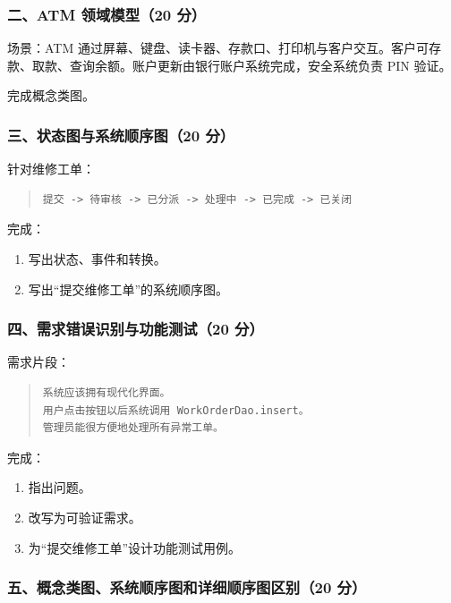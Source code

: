 \documentclass[UTF8,zihao=-4]{ctexart}
\begin{document}
\subsubsection*{二、ATM 领域模型（20 分）}


场景：ATM 通过屏幕、键盘、读卡器、存款口、打印机与客户交互。客户可存款、取款、查询余额。账户更新由银行账户系统完成，安全系统负责 PIN 验证。


完成概念类图。


\subsubsection*{三、状态图与系统顺序图（20 分）}


针对维修工单：


\begin{quote}
\footnotesize
\begin{verbatim}
提交 -> 待审核 -> 已分派 -> 处理中 -> 已完成 -> 已关闭
\end{verbatim}
\end{quote}


完成：


\begin{enumerate}
\item 写出状态、事件和转换。
\item 写出“提交维修工单”的系统顺序图。
\end{enumerate}


\subsubsection*{四、需求错误识别与功能测试（20 分）}


需求片段：


\begin{quote}
\footnotesize
\begin{verbatim}
系统应该拥有现代化界面。
用户点击按钮以后系统调用 WorkOrderDao.insert。
管理员能很方便地处理所有异常工单。
\end{verbatim}
\end{quote}


完成：


\begin{enumerate}
\item 指出问题。
\item 改写为可验证需求。
\item 为“提交维修工单”设计功能测试用例。
\end{enumerate}


\subsubsection*{五、概念类图、系统顺序图和详细顺序图区别（20 分）}
\end{document}
